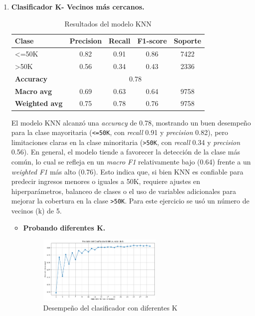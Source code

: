 \documentclass[12pt,a4paper]{article}
\begin{document}
\begin{enumerate}
    \item \textbf{Clasificador K- Vecinos más cercanos.}
      \begin{table}[H]
        \centering
        \small
          \begin{tabular}{lcccc}
            \toprule
            \textbf{Clase} & \textbf{Precision} & \textbf{Recall} & \textbf{F1-score} & \textbf{Soporte} \\
            \midrule
            <=50K & 0.82 & 0.91 & 0.86 & 7422 \\
            >50K  & 0.56 & 0.34 & 0.43 & 2336 \\
            \midrule
            \textbf{Accuracy}     & \multicolumn{4}{c}{0.78} \\
            \textbf{Macro avg}    & 0.69 & 0.63 & 0.64 & 9758 \\
            \textbf{Weighted avg} & 0.75 & 0.78 & 0.76 & 9758 \\
            \bottomrule
          \end{tabular}
          \caption{Resultados del modelo KNN}
      \end{table}

      El modelo KNN alcanzó una \emph{accuracy} de 0.78, mostrando un buen desempeño para la clase mayoritaria (\texttt{<=50K}, 
      con \emph{recall} 0.91 y \emph{precision} 0.82), pero limitaciones claras en la clase minoritaria (\texttt{>50K}, con \emph{recall} 0.34 y 
      \emph{precision} 0.56). En general, el modelo tiende a favorecer la detección de la clase más común, lo cual se refleja en un \emph{macro F1} 
      relativamente bajo (0.64) frente a un \emph{weighted F1} más alto (0.76). Esto indica que, si bien KNN es confiable para predecir ingresos menores 
      o iguales a 50K, requiere ajustes en hiperparámetros, balanceo de clases o el uso de variables adicionales para mejorar la cobertura en 
      la clase \texttt{>50K}. Para este ejercicio se usó un número de vecinos (k) de 5.

      \begin{itemize}
        \item \textbf{Probando diferentes K.}
        
        \begin{figure}[H]
          \centering
          \includegraphics[width=0.6\textwidth]{knn_accuracy_vs_k.png}
          \caption{Desempeño del clasificador con diferentes K}
          \label{fig:knns}
        \end{figure}


\end{itemize}
\end{enumerate}
\end{document}

